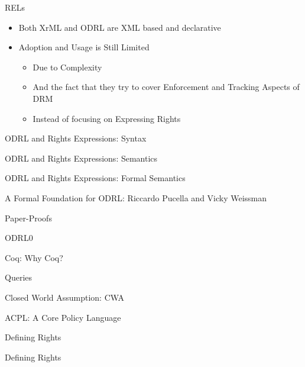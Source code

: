 \documentclass{beamer}
\begin{document}
\begin{frame}[fragile]{RELs}
\LARGE
\begin{itemize}
\item Both XrML and ODRL are XML based and declarative
\item Adoption and Usage is Still Limited
   \begin{itemize}
   \item Due to Complexity 
   \item And the fact that they try to cover Enforcement and Tracking Aspects of DRM
   \item Instead of focusing on Expressing Rights
   \end{itemize}
\end{itemize}
\end{frame}
\begin{frame}[fragile]{ODRL and Rights Expressions: Syntax}
\end{frame}
\begin{frame}[fragile]{ODRL and Rights Expressions: Semantics}
\end{frame}
\begin{frame}[fragile]{ODRL and Rights Expressions: Formal Semantics}
\end{frame}
\begin{frame}[fragile]{A Formal Foundation for ODRL: \newline Riccardo Pucella and Vicky Weissman}
\end{frame}
\begin{frame}[fragile]{Paper-Proofs}
\end{frame}
\begin{frame}[fragile]{ODRL0}
\end{frame}
\begin{frame}[fragile]{Coq: Why Coq?}
\end{frame}
\begin{frame}[fragile]{Queries}
\end{frame}
\begin{frame}[fragile]{Closed World Assumption: CWA}
\end{frame}
\begin{frame}[fragile]{ACPL: A Core Policy Language}
\end{frame}
\begin{frame}[fragile]{Defining Rights}
\end{frame}
\begin{frame}[fragile]{Defining Rights}
\end{frame}
\end{document}
